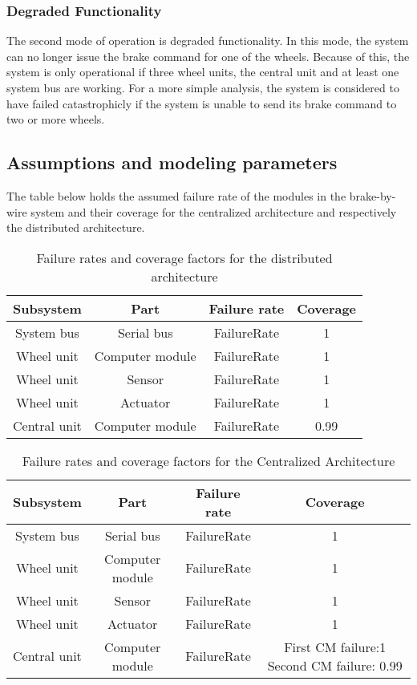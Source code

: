 \subsubsection{Degraded Functionality}
The second mode of operation is degraded functionality. In this mode, the system can no longer issue the brake command for one of the wheels. Because of this, the system is only 
operational if three wheel units, the central unit and at least one system bus are working. For a more simple analysis, the system is considered to have failed catastrophicly
if the system is unable to send its brake command to two or more wheels.
\subsection{Assumptions and modeling parameters}
The table below holds the assumed failure rate of the modules in the brake-by-wire system and their coverage for the centralized architecture and respectively the distributed architecture.  
\begin{table}[h]
\centering
\begin{tabular}{| c | c | c | c |}
\hline 
Subsystem & Part & Failure rate & Coverage\\
\hline
System bus & Serial bus& FailureRate & 1\\
\hline
Wheel unit & Computer module & FailureRate & 1\\
\hline
Wheel unit & Sensor & FailureRate & 1\\
\hline
Wheel unit & Actuator & FailureRate & 1\\
\hline
Central unit & Computer module & FailureRate & 0.99\\
\hline
\end{tabular}
\caption{Failure rates and coverage factors for the distributed architecture}
\label{tab:Put a Lable}
\end{table}
\begin{table}[h]
\centering
\begin{tabular}{| c | c | c | c |}
\hline 
Subsystem & Part & Failure rate & Coverage\\
\hline
System bus & Serial bus& FailureRate & 1\\
\hline
Wheel unit & Computer module & FailureRate & 1\\
\hline
Wheel unit & Sensor & FailureRate & 1\\
\hline
Wheel unit & Actuator & FailureRate & 1\\
\hline
Central unit & Computer module & FailureRate & First CM failure:1 Second CM failure: 0.99\\
\hline
\end{tabular}
\caption{Failure rates and coverage factors for the Centralized Architecture}
\label{tab:Put a Lable}
\end{table}
